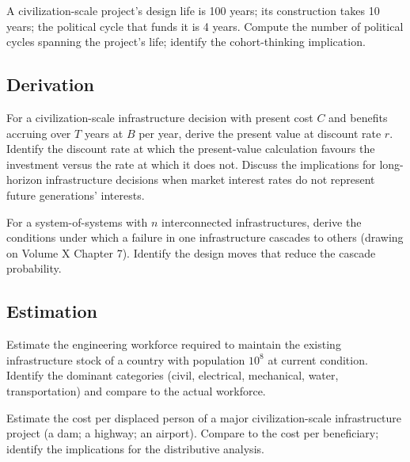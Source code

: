 \begin{exercise}
A civilization-scale project's design life is 100 years; its construction takes 10 years; the political cycle that funds it is 4 years. Compute the number of political cycles spanning the project's life; identify the cohort-thinking implication.
\end{exercise}

\subsection*{Derivation}

\begin{exercise}
For a civilization-scale infrastructure decision with present cost $C$ and benefits accruing over $T$ years at $B$ per year, derive the present value at discount rate $r$. Identify the discount rate at which the present-value calculation favours the investment versus the rate at which it does not. Discuss the implications for long-horizon infrastructure decisions when market interest rates do not represent future generations' interests.
\end{exercise}

\begin{exercise}
For a system-of-systems with $n$ interconnected infrastructures, derive the conditions under which a failure in one infrastructure cascades to others (drawing on Volume X Chapter 7). Identify the design moves that reduce the cascade probability.
\end{exercise}

\subsection*{Estimation}

\begin{exercise}
Estimate the engineering workforce required to maintain the existing infrastructure stock of a country with population $10^8$ at current condition. Identify the dominant categories (civil, electrical, mechanical, water, transportation) and compare to the actual workforce.
\end{exercise}

\begin{exercise}
Estimate the cost per displaced person of a major civilization-scale infrastructure project (a dam; a highway; an airport). Compare to the cost per beneficiary; identify the implications for the distributive analysis.
\end{exercise}

